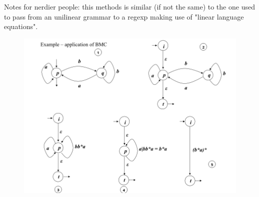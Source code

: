 		Notes for nerdier people: this methods is similar (if not the same) to the one used to pass from an unilinear grammar to a regexp making use of "linear language equations".
		\begin{figure}[htp]
			\centering
			\includegraphics[width = \textwidth]{./images/BMCMethod.png}
		\end{figure}
	
